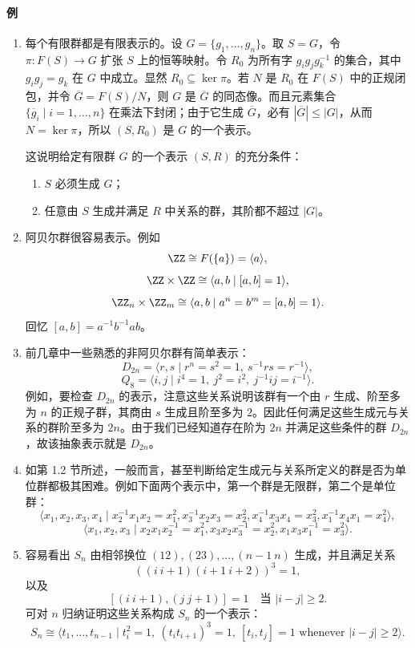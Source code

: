 \paragraph{例}
\begin{enumerate}[label=(\arabic*)]
  \item 每个有限群都是有限表示的。设 $G=\{g_1,
\ldots,g_n\}$。取 $S=G$，令 $\pi:F(S)\to G$ 扩张 $S$ 上的恒等映射。令 $R_0$ 为所有字 $g_ig_jg_k^{-1}$ 的集合，其中 $g_ig_j=g_k$ 在 $G$ 中成立。显然 $R_0\subseteq\ker\pi$。若 $N$ 是 $R_0$ 在 $F(S)$ 中的正规闭包，并令 $\overline G=F(S)/N$，则 $G$ 是 $\overline G$ 的同态像。而且元素集合 $\{\overline g_i\mid i=1,
\ldots,n\}$ 在乘法下封闭；由于它生成 $\overline G$，必有 $|\overline G|\leq |G|$，从而 $N=\ker\pi$，所以 $(S,R_0)$ 是 $G$ 的一个表示。

  这说明给定有限群 $G$ 的一个表示 $(S,R)$ 的充分条件：
  \begin{enumerate}[label=(\roman*)]
    \item $S$ 必须生成 $G$；
    \item 任意由 $S$ 生成并满足 $R$ 中关系的群，其阶都不超过 $|G|$。
  \end{enumerate}

  \item 阿贝尔群很容易表示。例如
  \[
    \ZZ\cong F(\{a\})=\langle a\rangle,
  \]
  \[
    \ZZ\times\ZZ\cong \langle a,b\mid [a,b]=1\rangle,
  \]
  \[
    \ZZ_n\times\ZZ_m\cong \langle a,b\mid a^n=b^m=[a,b]=1\rangle.
  \]
  回忆 $[a,b]=a^{-1}b^{-1}ab$。

  \item 前几章中一些熟悉的非阿贝尔群有简单表示：
  \[
    D_{2n}=\langle r,s\mid r^n=s^2=1,\ s^{-1}rs=r^{-1}\rangle,
  \]
  \[
    Q_8=\langle i,j\mid i^4=1,
\ j^2=i^2,
\ j^{-1}ij=i^{-1}\rangle.
  \]
  例如，要检查 $D_{2n}$ 的表示，注意这些关系说明该群有一个由 $r$ 生成、阶至多为 $n$ 的正规子群，其商由 $s$ 生成且阶至多为 $2$。因此任何满足这些生成元与关系的群阶至多为 $2n$。由于我们已经知道存在阶为 $2n$ 并满足这些条件的群 $D_{2n}$，故该抽象表示就是 $D_{2n}$。

  \item 如第 1.2 节所述，一般而言，甚至判断给定生成元与关系所定义的群是否为单位群都极其困难。例如下面两个表示中，第一个群是无限群，第二个是单位群：
  \[
  \langle x_1,x_2,x_3,x_4\mid x_2^{-1}x_1x_2=x_1^2,
  x_3^{-1}x_2x_3=x_2^2,
  x_4^{-1}x_3x_4=x_3^2,
  x_1^{-1}x_4x_1=x_4^2\rangle,
  \]
  \[
  \langle x_1,x_2,x_3\mid x_2x_1x_2^{-1}=x_1^2,
  x_3x_2x_3^{-1}=x_2^2,
  x_1x_3x_1^{-1}=x_3^2\rangle.
  \]

  \item 容易看出 $S_n$ 由相邻换位 $(12),(23),\ldots,(n-1\ n)$ 生成，并且满足关系
  \[
    ((i\ i+1)(i+1\ i+2))^3=1,
  \]
  以及
  \[
    [(i\ i+1),(j\ j+1)]=1\quad\text{当 }|i-j|\geq2.
  \]
  可对 $n$ 归纳证明这些关系构成 $S_n$ 的一个表示：
  \[
    S_n\cong\langle t_1,
\ldots,t_{n-1}\mid t_i^2=1,
\ (t_it_{i+1})^3=1,
\ [t_i,t_j]=1\text{ whenever }|i-j|\geq2\rangle.
  \]
\end{enumerate}

